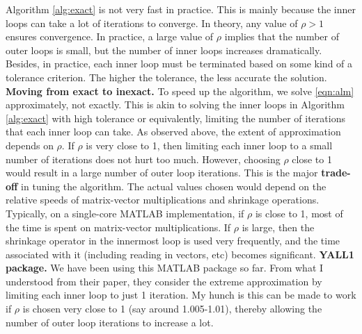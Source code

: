 \smallbreak
Algorithm \ref{alg:exact} is not very fast in practice. This is mainly because the inner loops can take a lot of iterations to converge. In theory, any value of $\rho > 1$ ensures convergence. In practice, a large value of $\rho$ implies that the number of outer loops is small, but the number of inner loops increases dramatically. Besides, in practice, each inner loop must be terminated based on some kind of a tolerance criterion. The higher the tolerance, the less accurate the solution.
\smallbreak
{\bf Moving from exact to inexact.} To speed up the algorithm, we solve \eqref{eqn:alm} approximately, not exactly. This is akin to solving the inner loops in Algorithm \ref{alg:exact} with high tolerance or equivalently, limiting the number of iterations that each inner loop can take. As observed above, the extent of approximation depends on $\rho$. If $\rho$ is very close to 1, then limiting each inner loop to a small number of iterations does not hurt too much. However, choosing $\rho$ close to 1 would result in a large number of outer loop iterations. This is the major {\bf trade-off} in tuning the algorithm. The actual values chosen would depend on the relative speeds of matrix-vector multiplications and shrinkage operations. 
\smallbreak
Typically, on a single-core MATLAB implementation, if $\rho$ is close to 1, most of the time is spent on matrix-vector multiplications. If $\rho$ is large, then the shrinkage operator in the innermost loop is used very frequently, and the time associated with it (including reading in vectors, etc) becomes significant. 
\smallbreak
{\bf YALL1 package.} We have been using this MATLAB package so far. From what I understood from their paper, they consider the extreme approximation by limiting each inner loop to just 1 iteration. My hunch is this can be made to work if $\rho$ is chosen very close to 1 (say around 1.005-1.01), thereby allowing the number of outer loop iterations to increase a lot. 

